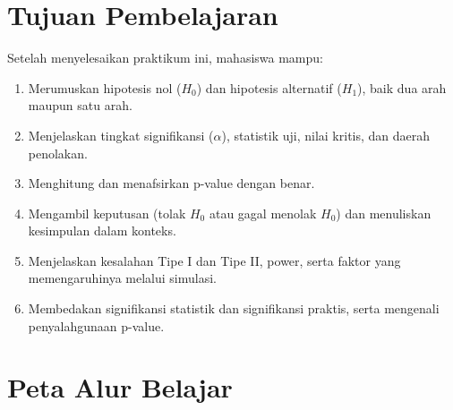 \documentclass[
  indonesian,
  letterpaper,
]{book}
\providecommand{\tightlist}{%
  \setlength{\itemsep}{0pt}\setlength{\parskip}{0pt}}
\begin{document}
\section{Tujuan Pembelajaran}\label{tujuan-pembelajaran-1}

Setelah menyelesaikan praktikum ini, mahasiswa mampu:

\begin{enumerate}
\def\labelenumi{\arabic{enumi}.}
\tightlist
\item
  Merumuskan hipotesis nol (\(H_0\)) dan hipotesis alternatif (\(H_1\)),
  baik dua arah maupun satu arah.
\item
  Menjelaskan tingkat signifikansi (\(\alpha\)), statistik uji, nilai
  kritis, dan daerah penolakan.
\item
  Menghitung dan menafsirkan p-value dengan benar.
\item
  Mengambil keputusan (tolak \(H_0\) atau gagal menolak \(H_0\)) dan
  menuliskan kesimpulan dalam konteks.
\item
  Menjelaskan kesalahan Tipe I dan Tipe II, power, serta faktor yang
  memengaruhinya melalui simulasi.
\item
  Membedakan signifikansi statistik dan signifikansi praktis, serta
  mengenali penyalahgunaan p-value.
\end{enumerate}

\section{Peta Alur Belajar}\label{peta-alur-belajar-1}
\end{document}
